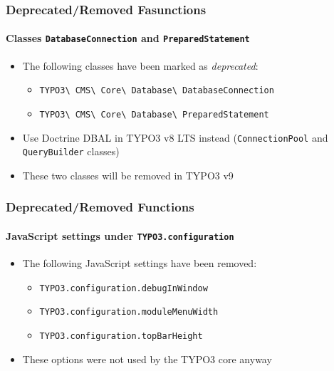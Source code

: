 \begin{frame}[fragile]
	\frametitle{Deprecated/Removed Fasunctions}
	\framesubtitle{Classes \texttt{DatabaseConnection} and \texttt{PreparedStatement}}

	\begin{itemize}
		\item The following classes have been marked as \textit{deprecated}:
			\begin{itemize}
				\item \texttt{TYPO3\textbackslash
						CMS\textbackslash
						Core\textbackslash
						Database\textbackslash
						DatabaseConnection}
				\item \texttt{TYPO3\textbackslash
						CMS\textbackslash
						Core\textbackslash
						Database\textbackslash
						PreparedStatement}
			\end{itemize}
		\item Use Doctrine DBAL in TYPO3 v8 LTS instead\newline
				(\texttt{ConnectionPool} and \texttt{QueryBuilder} classes)
		\item These two classes will be removed in TYPO3 v9
	\end{itemize}

\end{frame}


\begin{frame}[fragile]
	\frametitle{Deprecated/Removed Functions}
	\framesubtitle{JavaScript settings under \texttt{TYPO3.configuration}}

	\begin{itemize}
		\item The following JavaScript settings have been removed:

		\begin{itemize}
			\item \texttt{TYPO3.configuration.debugInWindow}
			\item \texttt{TYPO3.configuration.moduleMenuWidth}
			\item \texttt{TYPO3.configuration.topBarHeight}
		\end{itemize}

		\item These options were not used by the TYPO3 core anyway

	\end{itemize}

\end{frame}


